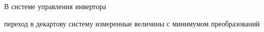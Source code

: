 \begin{frame}
\begin{circuitikz}





\end{circuitikz}
\end{frame}


\begin{frame}
\frametitle{}
	В системе управления инвертора 
	\begin{itemize}
		 переход в декартову систему
		 измеренные величины с минимумом преобразований 
	\end{itemize}
\end{frame}

